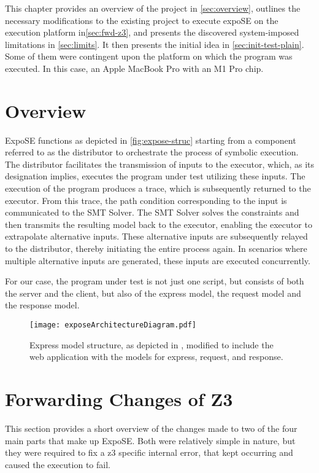 
This chapter provides an overview of the project in \autoref{sec:overview}, outlines the necessary modifications to the existing project to execute expoSE on the execution platform in\autoref{sec:fwd-z3}, and presents the discovered system-imposed limitations in \autoref{sec:limits}. It then presents the initial idea in \autoref{sec:init-test-plain}. Some of them were contingent upon the platform on which the program was executed. In this case, an Apple MacBook Pro with an M1 Pro chip. 

\section{Overview}
\label{sec:overview}


ExpoSE functions as depicted in \autoref{fig:expose-struc} starting from a component referred to as the distributor to orchestrate the process of symbolic execution. The distributor facilitates the transmission of inputs to the executor, which, as its designation implies, executes the program under test utilizing these inputs. The execution of the program produces a trace, which is subsequently returned to the executor. From this trace, the path condition corresponding to the input is communicated to the SMT Solver. The SMT Solver solves the constraints and then transmits the resulting model back to the executor, enabling the executor to extrapolate alternative inputs. These alternative inputs are subsequently relayed to the distributor, thereby initiating the entire process again. In scenarios where multiple alternative inputs are generated, these inputs are executed concurrently.

For our case, the program under test is not just one script, but consists of both the server and the client, but also of the express model, the request model and the response model. 



\begin{figure}
  \centering
\texttt{[image: exposeArchitectureDiagram.pdf]}
 \caption{Express model structure, as depicted in \cite{loring_practical_2021}, modified to include the web application with the models for express, request, and response.}
     \label{fig:expose-struc}
\end{figure}


\FloatBarrier
\section{Forwarding Changes of Z3}
\label{sec:fwd-z3}
This section provides a short overview of the changes made to two of the four main parts that make up ExpoSE. Both were relatively simple in nature, but they were required to fix a z3 specific internal error, that kept occurring and caused the execution to fail.

